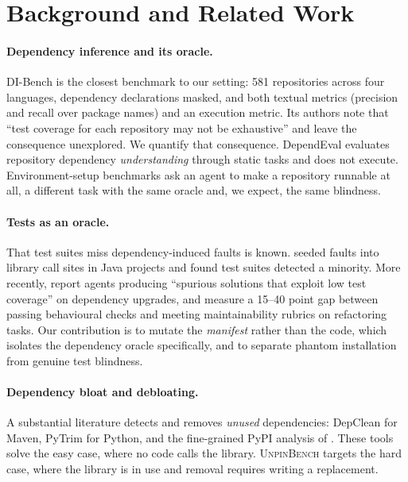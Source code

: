 \documentclass[11pt]{article}
\newcommand{\bench}{\textsc{UnpinBench}}
\newcommand{\dibench}{DI-Bench}
\begin{document}
\section{Background and Related Work}
\label{sec:related}

\paragraph{Dependency inference and its oracle.}
\dibench{} \citep{dibench2025} is the closest benchmark to our setting: 581 repositories across four languages, dependency declarations masked, and both textual metrics (precision and recall over package names) and an execution metric.
Its authors note that ``test coverage for each repository may not be exhaustive'' and leave the consequence unexplored.
We quantify that consequence.
DependEval \citep{dependeval2025} evaluates repository dependency \emph{understanding} through static tasks and does not execute.
Environment-setup benchmarks \citep{envbench2025,repo2run2025} ask an agent to make a repository runnable at all, a different task with the same oracle and, we expect, the same blindness.

\paragraph{Tests as an oracle.}
That test suites miss dependency-induced faults is known.
\citet{hejderup2022trust} seeded faults into library call sites in Java projects and found test suites detected a minority.
More recently, \citet{timemachine2026} report agents producing ``spurious solutions that exploit low test coverage'' on dependency upgrades, and \citet{sweatlas2026} measure a 15--40 point gap between passing behavioural checks and meeting maintainability rubrics on refactoring tasks.
Our contribution is to mutate the \emph{manifest} rather than the code, which isolates the dependency oracle specifically, and to separate phantom installation from genuine test blindness.

\paragraph{Dependency bloat and debloating.}
A substantial literature detects and removes \emph{unused} dependencies: DepClean \citep{soto2021longitudinal} for Maven, PyTrim \citep{pytrim2025} for Python, and the fine-grained PyPI analysis of \citet{drosos2024bloat}.
These tools solve the easy case, where no code calls the library.
\bench{} targets the hard case, where the library is in use and removal requires writing a replacement.
\end{document}
